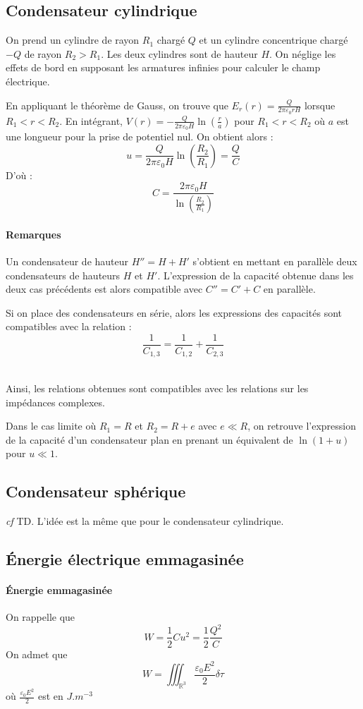 \documentclass[french]{book}
\theoremstyle{plain}
\theoremstyle{definition}
\theoremstyle{remark}
\newcommand{\R}{\mathbb{R}}
\begin{document}
\subsection{Condensateur cylindrique}
On prend un cylindre de rayon $R_1$ chargé $Q$ et un cylindre concentrique chargé $-Q$ de rayon $R_2>R_1$. Les deux cylindres sont de hauteur $H$. On néglige les effets de bord en supposant les armatures infinies pour calculer le champ électrique. \\ \par En appliquant le théorème de Gauss, on trouve que $E_r(r)=\displaystyle\frac{Q}{2\pi\varepsilon_0 rH}$ lorsque $R_1<r<R_2$. En intégrant, $V(r)=-\displaystyle\frac{Q}{2\pi\varepsilon_0 H}\ln\left(\frac{r}{a}\right)$ pour $R_1<r<R_2$ où $a$ est une longueur pour la prise de potentiel nul. On obtient alors : $$u=\frac{Q}{2\pi\varepsilon_0 H}\ln\left(\frac{R_2}{R_1}\right)=\frac{Q}{C}$$ D'où : $$C=\frac{2\pi\varepsilon_0 H}{\ln\left(\frac{R_2}{R_1}\right)}$$
\paragraph{Remarques} Un condensateur de hauteur $H''=H+H'$ s'obtient en mettant en parallèle deux condensateurs de hauteurs $H$ et $H'$. L'expression de la capacité obtenue dans les deux cas précédents est alors compatible avec $C''=C'+C$ en parallèle. \\ \par Si on place des condensateurs en série, alors les expressions des capacités sont compatibles avec la relation : $$\frac{1}{C_{1,3}}=\frac{1}{C_{1,2}}+\frac{1}{C_{2,3}}$$ \\ \par Ainsi, les relations obtenues sont compatibles avec les relations sur les impédances complexes.\\ \par Dans le cas limite où $R_1=R$ et $R_2=R+e$ avec $e\ll R$, on retrouve l'expression de la capacité d'un condensateur plan en prenant un équivalent de $\ln(1+u)$ pour $u\ll 1$.
\subsection{Condensateur sphérique}
\textit{cf} TD. L'idée est la même que pour le condensateur cylindrique.
\subsection{Énergie électrique emmagasinée}
\paragraph{Énergie emmagasinée} On rappelle que $$W=\frac12Cu^2=\frac12\frac{Q^2}{C}$$ On admet que $$W=\iiint_{\R^3}\frac{\varepsilon_0E^2}{2}\delta \tau$$ où $\displaystyle\frac{\varepsilon_0E^2}{2}$ est en $J.m^{-3}$
\end{document}
